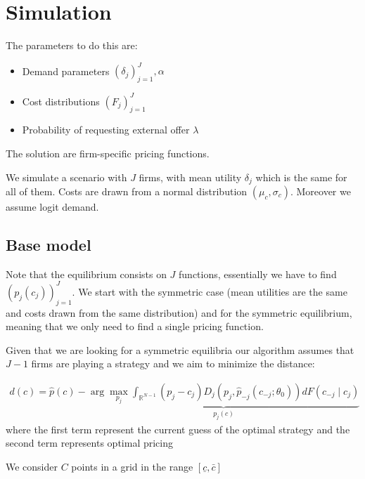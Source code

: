 \documentclass[12pt]{article}
\begin{document}
\newpage 
 
\section{Simulation}
The parameters to do this are: 
\begin{itemize}
    \item Demand parameters $(\delta_j)_{j=1}^J, \alpha$
    \item Cost distributions $(F_j)_{j=1}^J$
    \item Probability of requesting external offer $\lambda$
\end{itemize}

The solution are firm-specific pricing functions. 

\medskip

We simulate a scenario with $J$ firms, with mean utility $\delta_j$ which is the same for all of them. Costs are drawn from a normal distribution $(\mu_c, \sigma_c)$. %
Moreover we assume logit demand. 
\subsection{Base model}
Note that the equilibrium consists on $J$ functions, essentially we have to find $(p_j(c_j))_{j=1}^J$. We start with the symmetric case (mean utilities are the same and costs drawn from the same distribution) and for the symmetric equilibrium, meaning that we only need to find a single pricing function. 

Given that we are looking for a symmetric equilibria our algorithm assumes that $J-1$ firms are playing a strategy  and we aim to minimize the distance: 


\begin{align} %
    d(c) = \hat{p}(c) -\underbrace{\arg \max_{p_j} \int_{\mathbb{R}^{N-1}}^{} (p_j - c_j) D_j(p_j, \hat{p}_{-j}(c_{-j}; \theta_0)) dF(c_{-j} \mid c_j)}_{p_j(c)}
\end{align} 
where the first term represent the current guess of the optimal strategy and the  second term represents optimal pricing 


We consider $C$ points in a grid in the range $[\underline{c}, \bar{c}] $
\end{document}
